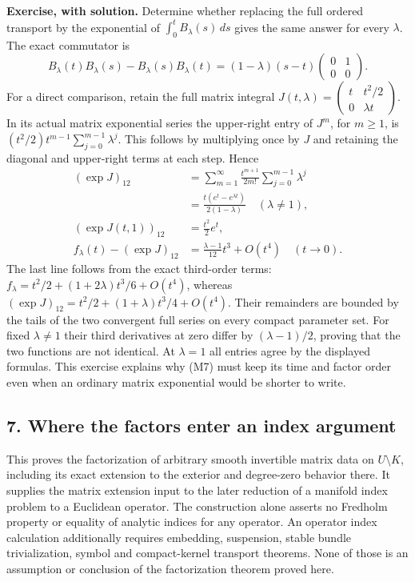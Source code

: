 \documentclass[
  11pt,
]{article}
\begin{document}
\textbf{Exercise, with solution.} Determine whether replacing the full
ordered transport by the exponential of \(\int_0^tB_\lambda(s)\,ds\)
gives the same answer for every \(\lambda\). The exact commutator is \[
 B_\lambda(t)B_\lambda(s)-B_\lambda(s)B_\lambda(t)
  =(1-\lambda)(s-t)\begin{pmatrix}0&1\\0&0\end{pmatrix}.
 \tag{MP5}
\] For a direct comparison, retain the full matrix integral
\(J(t,\lambda)=\begin{pmatrix}t&t^2/2\\0&\lambda t\end{pmatrix}\). In
its actual matrix exponential series the upper-right entry of \(J^m\),
for \(m\geq1\), is \( (t^2/2)t^{m-1}\sum_{j=0}^{m-1}\lambda^j\). This
follows by multiplying once by \(J\) and retaining the diagonal and
upper-right terms at each step. Hence \[
 \begin{aligned}
 (\exp J)_{12}
 &=\sum_{m=1}^{\infty}
       \frac{t^{m+1}}{2m!}\sum_{j=0}^{m-1}\lambda^j\\
 &=\frac{t(e^t-e^{\lambda t})}{2(1-\lambda)}\quad(\lambda\ne1),\\
 (\exp J(t,1))_{12}&=\frac{t^2}{2}e^t,\\
 f_\lambda(t)-(\exp J)_{12}
 &=\frac{\lambda-1}{12}t^3+O(t^4)\quad(t\longrightarrow0).
 \end{aligned}
 \tag{MP6}
\] The last line follows from the exact third-order terms:
\(f_\lambda=t^2/2+(1+2\lambda)t^3/6+O(t^4)\), whereas
\((\exp J)_{12}=t^2/2+(1+\lambda)t^3/4+O(t^4)\). Their remainders are
bounded by the tails of the two convergent full series on every compact
parameter set. For fixed \(\lambda\ne1\) their third derivatives at zero
differ by \((\lambda-1)/2\), proving that the two functions are not
identical. At \(\lambda=1\) all entries agree by the displayed formulas.
This exercise explains why (M7) must keep its time and factor order even
when an ordinary matrix exponential would be shorter to write.

\subsection{7. Where the factors enter an index
argument}\label{where-the-factors-enter-an-index-argument}

This proves the factorization of arbitrary smooth invertible matrix data
on \(U\setminus K\), including its exact extension to the exterior and
degree-zero behavior there. It supplies the matrix extension input to
the later reduction of a manifold index problem to a Euclidean operator.
The construction alone asserts no Fredholm property or equality of
analytic indices for any operator. An operator index calculation
additionally requires embedding, suspension, stable bundle
trivialization, symbol and compact-kernel transport theorems. None of
those is an assumption or conclusion of the factorization theorem proved
here.
\end{document}

